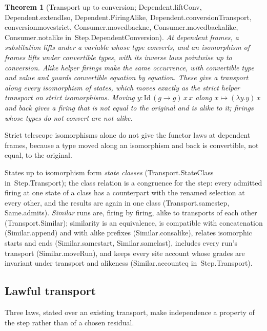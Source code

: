 \documentclass[11pt]{article}
\newtheorem{theorem}{Theorem}
\theoremstyle{remark}
\newcommand{\lean}[1]{{\ttfamily\def\_{\textunderscore\allowbreak}#1}}
\newcommand{\inmod}[1]{in~{\ttfamily\def\_{\textunderscore\allowbreak}#1}}
\begin{document}
\begin{theorem}[Transport up to conversion; \lean{Dependent.liftConv}, \lean{Dependent.extendIso}, \lean{Dependent.FiringAlike}, \lean{Dependent.conversionTransport}, \lean{conversion\_move\_strict}, \lean{Consumer.moved\_back\_ne}, \lean{Consumer.moved\_back\_alike}, \lean{Consumer.not\_alike} \inmod{Step.DependentConversion}]
At dependent frames, a substitution lifts under a variable whose type converts, and an isomorphism of
frames lifts under convertible types, with its inverse laws pointwise up to conversion. Alike helper
firings make the same occurrence, with convertible type and value and guards convertible equation by
equation. These give a transport along every isomorphism of states, which moves exactly as the strict
helper transport on strict isomorphisms. Moving $y : \mathrm{Id}\,(g\to g)\,x\,x$ along $x\mapsto(\lambda
y.y)\,x$ and back gives a firing that is not equal to the original and is alike to it; firings whose
types do not convert are not alike.
\end{theorem}

Strict telescope isomorphisms alone do not give the functor laws at dependent frames, because a type
moved along an isomorphism and back is convertible, not equal, to the original.

States up to isomorphism form \emph{state classes} (\lean{Transport.StateClass} \inmod{Step.Transport}); the class relation is a
congruence for the step: every admitted firing at one state of a class has a counterpart with the
renamed selection at every other, and the results are again in one class (\lean{Transport.same\_step},
\lean{Same.admits}). \emph{Similar} runs are, firing by firing, alike to transports of each other
(\lean{Transport.Similar}); similarity is an equivalence, is compatible with concatenation
(\lean{Similar.append}) and with alike prefixes (\lean{Similar.cons\_alike}), relates isomorphic starts and
ends (\lean{Similar.same\_start}, \lean{Similar.same\_last}), includes every run's transport
(\lean{Similar.moveRun}), and keeps every site account whose grades are invariant under transport and
alikeness (\lean{Similar.account\_eq} \inmod{Step.Transport}).

\subsection{Lawful transport}\label{sec:lawful}

Three laws, stated over an existing transport, make independence a property of the step rather than
of a chosen residual.
\end{document}
